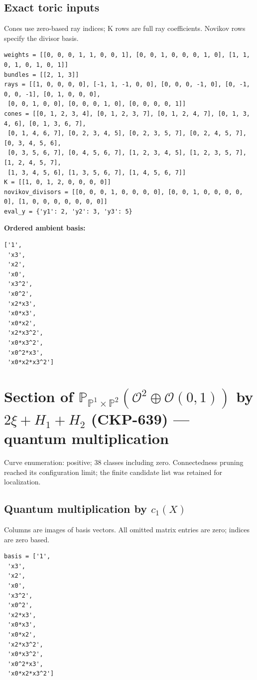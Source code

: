 \documentclass[10pt,a4paper]{article}
\begin{document}
\subsection*{Exact toric inputs}
Cones use zero-based ray indices; K rows are full ray coefficients. Novikov rows specify the divisor basis.

\begin{lstlisting}
weights = [[0, 0, 0, 1, 1, 0, 0, 1], [0, 0, 1, 0, 0, 0, 1, 0], [1, 1, 0, 1, 0, 1, 0, 1]]
bundles = [[2, 1, 3]]
rays = [[1, 0, 0, 0, 0], [-1, 1, -1, 0, 0], [0, 0, 0, -1, 0], [0, -1, 0, 0, -1], [0, 1, 0, 0, 0],
 [0, 0, 1, 0, 0], [0, 0, 0, 1, 0], [0, 0, 0, 0, 1]]
cones = [[0, 1, 2, 3, 4], [0, 1, 2, 3, 7], [0, 1, 2, 4, 7], [0, 1, 3, 4, 6], [0, 1, 3, 6, 7],
 [0, 1, 4, 6, 7], [0, 2, 3, 4, 5], [0, 2, 3, 5, 7], [0, 2, 4, 5, 7], [0, 3, 4, 5, 6],
 [0, 3, 5, 6, 7], [0, 4, 5, 6, 7], [1, 2, 3, 4, 5], [1, 2, 3, 5, 7], [1, 2, 4, 5, 7],
 [1, 3, 4, 5, 6], [1, 3, 5, 6, 7], [1, 4, 5, 6, 7]]
K = [[1, 0, 1, 2, 0, 0, 0, 0]]
novikov_divisors = [[0, 0, 0, 1, 0, 0, 0, 0], [0, 0, 1, 0, 0, 0, 0, 0], [1, 0, 0, 0, 0, 0, 0, 0]]
eval_y = {'y1': 2, 'y2': 3, 'y3': 5}
\end{lstlisting}

\textbf{Ordered ambient basis:}
\begin{lstlisting}
['1',
 'x3',
 'x2',
 'x0',
 'x3^2',
 'x0^2',
 'x2*x3',
 'x0*x3',
 'x0*x2',
 'x2*x3^2',
 'x0*x3^2',
 'x0^2*x3',
 'x0*x2*x3^2']
\end{lstlisting}

\clearpage\section*{Section of $\mathbb P_{\mathbb P^{1}\times \mathbb P^{2}}(\mathcal O^{2}\oplus \mathcal O(0,1))$ by $2\xi +H_{1}+H_{2}$ (CKP-639) --- quantum multiplication}

Curve enumeration: positive; 38 classes including zero.
Connectedness pruning reached its configuration limit; the finite candidate list was retained for localization.
\subsection*{Quantum multiplication by $c_1(X)$}
Columns are images of basis vectors. All omitted matrix entries are zero; indices are zero based.

\begin{lstlisting}
basis = ['1',
 'x3',
 'x2',
 'x0',
 'x3^2',
 'x0^2',
 'x2*x3',
 'x0*x3',
 'x0*x2',
 'x2*x3^2',
 'x0*x3^2',
 'x0^2*x3',
 'x0*x2*x3^2']
\end{lstlisting}
\end{document}
